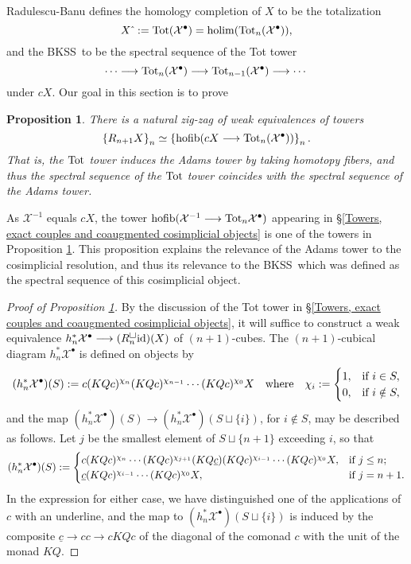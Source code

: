 \documentclass[11pt]{amsart} \renewcommand{\baselinestretch}{1.2}
\theoremstyle{plain}
\newtheorem{prop}[thm]{Proposition}
\numberwithin{equation}{section} %
\theoremstyle{plain}
\newtheorem{prop}[thm]{Proposition}
\numberwithin{equation}{chapter} %
\DeclareMathOperator*{\holim}{holim}
\DeclareMathOperator*{\hofib}{hofib}
\renewcommand{\to}{\longrightarrow}
\newcommand{\calx}{\mathcal{X}}
\newcommand{\Id}{\mathrm{id}}
\newcommand{\plainD}{R}
\newcommand{\BKSS}{BKSS}
\begin{document}
\begin{Bousfield-Kan spectral sequence}
Radulescu-Banu defines the homology completion of $X$ to be the totalization
\[X\hat{\ }:=\textup{Tot}(\calx^\bullet)=\holim (\textup{Tot}_n(\calx^\bullet)),\]
and the \BKSS\ to be the spectral sequence of the Tot tower
\[\cdots \to\textup{Tot}_n(\calx^\bullet)\to \textup{Tot}_{n-1}(\calx^\bullet)\to\cdots \]
under $cX$. Our goal in this section is to prove
\begin{prop}
\label{towerIdentification}
There is a natural zig-zag of weak equivalences of towers \[\left\{\plainD_{n+1}X\right\}_n\simeq\left\{\hofib(cX\to\textup{Tot}_{n}(\calx^\bullet))\right\}_n.\] That is,  the $\textup{Tot}$ tower induces the Adams tower by taking homotopy fibers, and thus the spectral sequence of the $\textup{Tot}$ tower coincides with the spectral sequence of the Adams tower.
\end{prop}
\noindent As $\calx^{-1}$ equals $cX$, the tower $\hofib(\calx^{-1}\to\textup{Tot}_n\calx^{\bullet})$ appearing in \S\ref{Towers, exact couples and coaugmented cosimplicial objects} is one of the towers in Proposition \ref{towerIdentification}. This proposition explains the relevance of the Adams tower to the cosimplicial resolution, and thus its relevance to the \BKSS\ which was defined as the spectral sequence of this cosimplicial object.
\begin{proof}[Proof of Proposition \ref{towerIdentification}] 
By the discussion of the Tot tower in \S\ref{Towers, exact couples and coaugmented cosimplicial objects}, it will suffice to construct a weak equivalence $h_n^*\calx^\bullet\to (\plainD_n^{\smash{\square}}\Id  )(X)$ of $(n+1)$-cubes. The $(n+1)$-cubical diagram $h_n^*\calx^\bullet$ is defined on objects by
\[(h_n^*\calx^\bullet)(S):= c(KQc)^{\chi_{n}}(KQc)^{\chi_{n-1}}\cdots (KQc)^{\chi_0}X\quad \textup{where}\quad \chi_i:=\begin{cases}
1,&\textup{if }i\in S,\\
0,&\textup{if }i\notin S,
\end{cases}
\]
and the map $(h_n^*\calx^\bullet)(S)\to (h_n^*\calx^\bullet)(S\sqcup\{i\})$, for $i\notin S$, may be described as follows. Let $j$ be the smallest element of $S\sqcup\{n+1\}$ exceeding $i$, so that
\[(h_n^*\calx^\bullet)(S):= \begin{cases}
c(KQc)^{\chi_{n}}\cdots (KQc)^{\chi_{j+1}}(KQ\underline{c})(KQc)^{\chi_{i-1}}\cdots (KQc)^{\chi_0}X,&\textup{if }j\leq n;\\
\underline{c}(KQc)^{\chi_{i-1}}\cdots (KQc)^{\chi_0}X,&\textup{if }j=n+1.
\end{cases}
\]
In the expression for either case, we have distinguished one of the applications of $c$ with an underline, and the map to $(h_n^*\calx^\bullet)(S\sqcup\{i\})$ is induced by the composite $\underline{c}\to cc\to cKQc$ of the diagonal of the comonad $c$ with the unit of the monad $KQ$. 


\end{proof}
\end{Bousfield-Kan spectral sequence}
\end{document}
